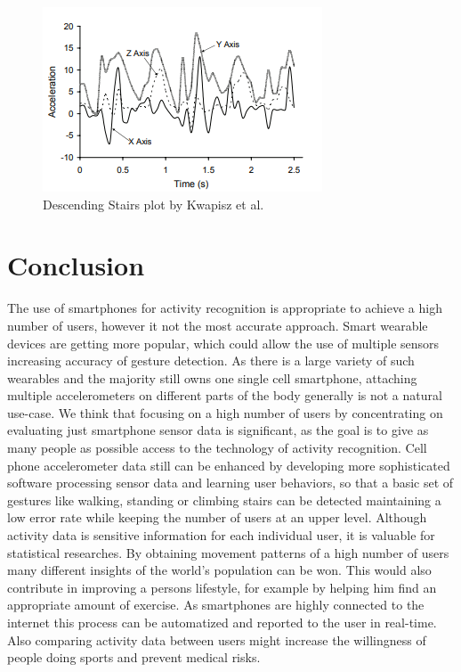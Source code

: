 \documentclass[conference]{IEEEtran}
\begin{document}
\begin{figure}[!p]
  \includegraphics[width=\linewidth]{descending_stairs.png}
  \caption{Descending Stairs plot by Kwapisz et al. ~\cite{Kwapisz2011}}
  \label{fig:descendingStairs}
\end{figure}
\clearpage

\section{Conclusion}
The use of smartphones for activity recognition is appropriate to achieve a high number of users, however it not the most accurate approach.
Smart wearable devices are getting more popular, which could allow the use of multiple sensors increasing accuracy of gesture detection. As there is a large variety of such wearables and the majority still owns one single cell smartphone, attaching multiple accelerometers  on different parts of the body generally is not a natural use-case. We think that focusing on a high number of users by concentrating on evaluating just smartphone sensor data is significant, as the goal is to give as many people as possible access to the technology of activity recognition.
Cell phone accelerometer data still can be enhanced by developing more sophisticated software processing sensor data and learning user behaviors, so that a basic set of gestures like walking, standing or climbing stairs can be detected maintaining a low error rate while keeping the number of users at an upper level.
Although activity data is sensitive information for each individual user, it is valuable for statistical researches. By obtaining movement patterns of a high number of users many different insights of the world's population can be won. This would also contribute in improving a persons lifestyle, for example by helping him find an appropriate amount of exercise. As smartphones are highly connected to the internet this process can be automatized and reported to the user in real-time. Also comparing activity data between users might increase the willingness of people doing sports and prevent medical risks.
\end{document}
